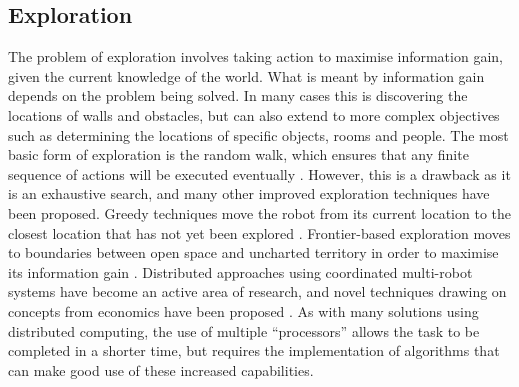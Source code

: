 \documentclass[conference]{IEEEtran}
\begin{document}
\subsection{Exploration}
The problem of exploration involves taking action to maximise information gain, given the current knowledge of the world. What is meant by information gain depends on the problem being solved. In many cases this is discovering the locations of walls and obstacles, but can also extend to more complex objectives such as determining the locations of specific objects, rooms and people. The most basic form of exploration is the random walk, which ensures that any finite sequence of actions will be executed eventually \cite{thrunexploration}. However, this is a drawback as it is an exhaustive search, and many other improved exploration techniques have been proposed. Greedy techniques move the robot from its current location to the closest location that has not yet been explored \cite{greedy}. Frontier-based exploration moves to boundaries between open space and uncharted territory in order to maximise its information gain \cite{frontier}. Distributed approaches using coordinated multi-robot systems have become an active area of research, and novel techniques drawing on concepts from economics have been proposed \cite{multiexp, marketexp}. As with many solutions using distributed computing, the use of multiple ``processors'' allows the task to be completed in a shorter time, but requires the implementation of algorithms that can make good use of these increased capabilities.
\end{document}
